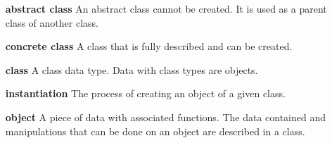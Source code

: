 \documentclass{report}
\begin{document}
\begin{itemize}
\item[{\bfseries abstract class}]
          An abstract class cannot be created.  It is used
          as a parent class of another class.
\item[{\bfseries concrete class}]
          A class that is fully described and can be created.
\item[{\bfseries class}]
          A class data type.  Data with class types are objects.
\item[{\bfseries instantiation}]
          The process of creating an object of a given class.
\item[{\bfseries object}]
          A piece of data with associated functions.  The data
          contained and manipulations that can be done on an object
          are described in a class.
\end{itemize}

\printindex
\end{document}
